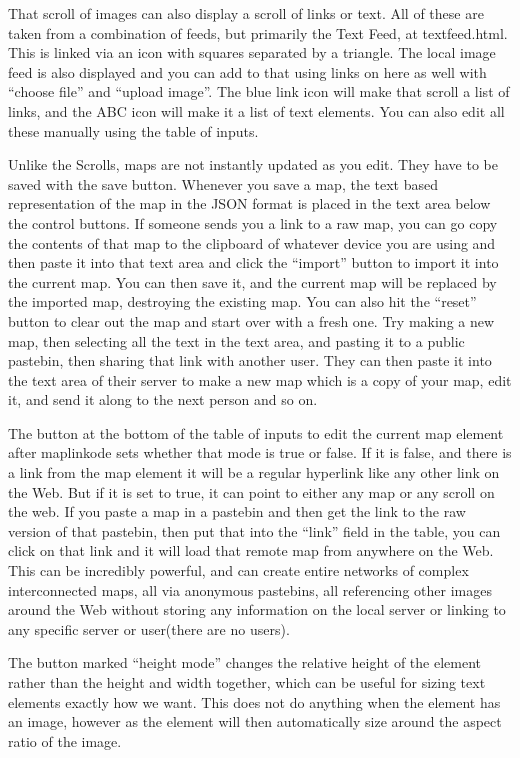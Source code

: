 That scroll of images can also display a scroll of links or text.  All of these are taken from a combination of feeds, but primarily the Text Feed, at textfeed.html. This is linked via an icon with squares separated by a triangle.  The local image feed is also displayed and you can add to that using links on here as well with ``choose file'' and ``upload image''.  The blue link icon will make that scroll a list of links, and the ABC icon will make it a list of text elements.  You can also edit all these manually using the table of inputs.  

Unlike the Scrolls, maps are not instantly updated as you edit.  They have to be saved with the save button. Whenever you save a map, the text based representation of the map in the JSON format is placed in the text area below the control buttons.  If someone sends you a link to a raw map, you can go copy the contents of that map to the clipboard of whatever device you are using and then paste it into that text area and click the ``import'' button to import it into the current map.  You can then save it, and the current map will be replaced by the imported map, destroying the existing map.  You can also hit the ``reset'' button to clear out the map and start over with a fresh one.   Try making a new map, then selecting all the text in the text area, and pasting it to a public pastebin, then sharing that link with another user.  They can then paste it into the text area of their server to make a new map which is a copy of your map, edit it, and send it along to the next person and so on.

 The button at the bottom of the table of inputs to edit the current map element after maplinkode sets whether that mode is true or false. If it is false, and there is a link from the map element it will be a regular hyperlink like any other link on the Web.  But if it is set to true, it can point to either any map or any scroll on the web.  If you paste a map in a pastebin and then get the link to the raw version of that pastebin, then put that into the ``link'' field in the table, you can click on that link and it will load that remote map from anywhere on the Web.  This can be incredibly powerful, and can create entire networks of complex interconnected maps, all via anonymous pastebins, all referencing other images around the Web without storing any information on the local server or linking to any specific server or user(there are no users).

The button marked ``height mode'' changes the relative height of the element rather than the height and width together, which can be useful for sizing text elements exactly how we want.  This does not do anything when the element has an image, however as the element will then automatically size around the aspect ratio of the image.  

